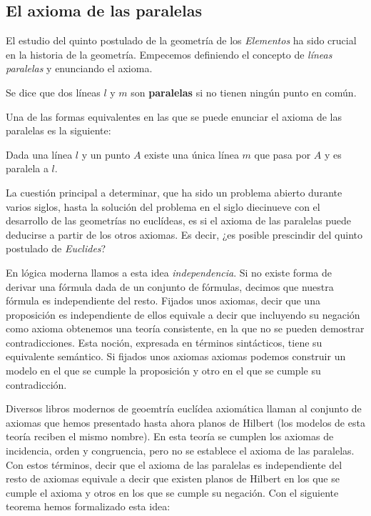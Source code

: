 \subsection{El axioma de las paralelas}

El estudio del quinto postulado de la geometría de los \textit{Elementos} ha
sido crucial en la historia de la geometría. Empecemos definiendo el
concepto de \textit{líneas paralelas} y enunciando el axioma.

\begin{defin*}
	Se dice que dos líneas $l$ y $m$ son \textbf{paralelas} si no tienen ningún
	punto en común.
\end{defin*}

Una de las formas equivalentes en las que se puede enunciar el axioma de las
paralelas es la siguiente:


\begin{axb}[P]\label{ax:P}
	Dada una línea $l$ y un punto $A$ existe una única línea $m$ que pasa por
	$A$ y es paralela a $l$.
\end{axb}


La cuestión principal a determinar, que ha sido un problema abierto durante
varios siglos, hasta la solución del problema en el siglo diecinueve con el
desarrollo de las geometrías no euclídeas, es si el axioma de las paralelas
puede deducirse a partir de los otros axiomas. Es decir, ¿es posible prescindir
del quinto postulado de \textit{Euclides}?

En lógica moderna llamos a esta idea \textit{independencia}. Si no existe forma
de derivar una fórmula dada de un conjunto de fórmulas, decimos que nuestra
fórmula es independiente del resto. Fijados unos axiomas, decir que una
proposición es independiente de ellos equivale a decir que incluyendo su
negación como axioma obtenemos una teoría consistente, en la que no se pueden
demostrar contradicciones. Esta noción, expresada en términos sintácticos, tiene
su equivalente semántico. Si fijados unos axiomas axiomas podemos construir un
modelo en el que se cumple la proposición y otro en el que se cumple su
contradicción.

Diversos libros modernos de geoemtría euclídea axiomática llaman al conjunto de
axiomas que hemos presentado hasta ahora planos de Hilbert (los modelos
de esta teoría reciben el mismo nombre). En esta teoría se cumplen los axiomas
de incidencia, orden y congruencia, pero no se establece el axioma de las
paralelas. Con estos términos, decir que el axioma de las paralelas es
independiente del resto de axiomas equivale a decir que existen planos de
Hilbert en los que se cumple el axioma y otros en los que se cumple su negación.
Con el siguiente teorema hemos formalizado esta idea:

